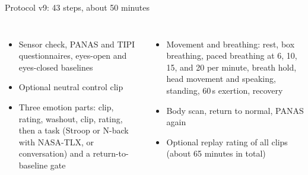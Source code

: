 \documentclass[aspectratio=169,11pt]{beamer}
\begin{document}
\begin{frame}{Protocol v9: 43 steps, about 50 minutes}
  \centering
  \vspace{0.6em}

  \footnotesize
  \begin{columns}[T]
    \begin{itemize}
      \item Sensor check, PANAS and TIPI questionnaires, eyes-open and eyes-closed baselines
      \item Optional neutral control clip
      \item Three emotion parts: clip, rating, washout, clip, rating, then a task (Stroop or N-back with NASA-TLX, or conversation) and a return-to-baseline gate
    \end{itemize}
    \begin{itemize}
      \item Movement and breathing: rest, box breathing, paced breathing at 6, 10, 15, and 20 per minute, breath hold, head movement and speaking, standing, 60\,s exertion, recovery
      \item Body scan, return to normal, PANAS again
      \item Optional replay rating of all clips (about 65 minutes in total)
    \end{itemize}
  \end{columns}
\end{frame}
\end{document}
